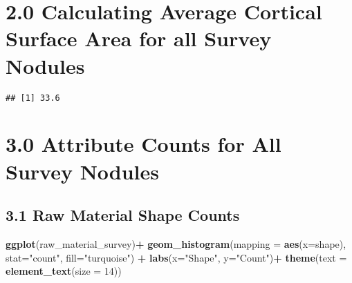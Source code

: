\documentclass[
]{article}
\newenvironment{Shaded}{\begin{snugshade}}{\end{snugshade}}
\newcommand{\AttributeTok}[1]{\textcolor[rgb]{0.13,0.29,0.53}{#1}}
\newcommand{\CommentTok}[1]{\textcolor[rgb]{0.56,0.35,0.01}{\textit{#1}}}
\newcommand{\DecValTok}[1]{\textcolor[rgb]{0.00,0.00,0.81}{#1}}
\newcommand{\FunctionTok}[1]{\textcolor[rgb]{0.13,0.29,0.53}{\textbf{#1}}}
\newcommand{\NormalTok}[1]{#1}
\newcommand{\OtherTok}[1]{\textcolor[rgb]{0.56,0.35,0.01}{#1}}
\newcommand{\SpecialCharTok}[1]{\textcolor[rgb]{0.81,0.36,0.00}{\textbf{#1}}}
\newcommand{\StringTok}[1]{\textcolor[rgb]{0.31,0.60,0.02}{#1}}
\begin{document}
\hypertarget{calculating-average-cortical-surface-area-for-all-survey-nodules}{%
\section{2.0 Calculating Average Cortical Surface Area for all Survey
Nodules}\label{calculating-average-cortical-surface-area-for-all-survey-nodules}}

\begin{Shaded}
\end{Shaded}

\begin{verbatim}
## [1] 33.6
\end{verbatim}

\hypertarget{attribute-counts-for-all-survey-nodules}{%
\section{3.0 Attribute Counts for All Survey
Nodules}\label{attribute-counts-for-all-survey-nodules}}

\hypertarget{raw-material-shape-counts}{%
\subsection{3.1 Raw Material Shape
Counts}\label{raw-material-shape-counts}}

\begin{Shaded}
\begin{Highlighting}[]
\FunctionTok{ggplot}\NormalTok{(raw\_material\_survey)}\SpecialCharTok{+}
  \FunctionTok{geom\_histogram}\NormalTok{(}\AttributeTok{mapping =} \FunctionTok{aes}\NormalTok{(}\AttributeTok{x=}\NormalTok{shape), }\AttributeTok{stat=}\StringTok{"count"}\NormalTok{, }\AttributeTok{fill=}\StringTok{"turquoise"}\NormalTok{) }\SpecialCharTok{+}
  \FunctionTok{labs}\NormalTok{(}\AttributeTok{x=}\StringTok{"Shape"}\NormalTok{, }\AttributeTok{y=}\StringTok{"Count"}\NormalTok{)}\SpecialCharTok{+}
  \FunctionTok{theme}\NormalTok{(}\AttributeTok{text =} \FunctionTok{element\_text}\NormalTok{(}\AttributeTok{size =} \DecValTok{14}\NormalTok{))}
\end{Highlighting}
\end{Shaded}
\end{document}
